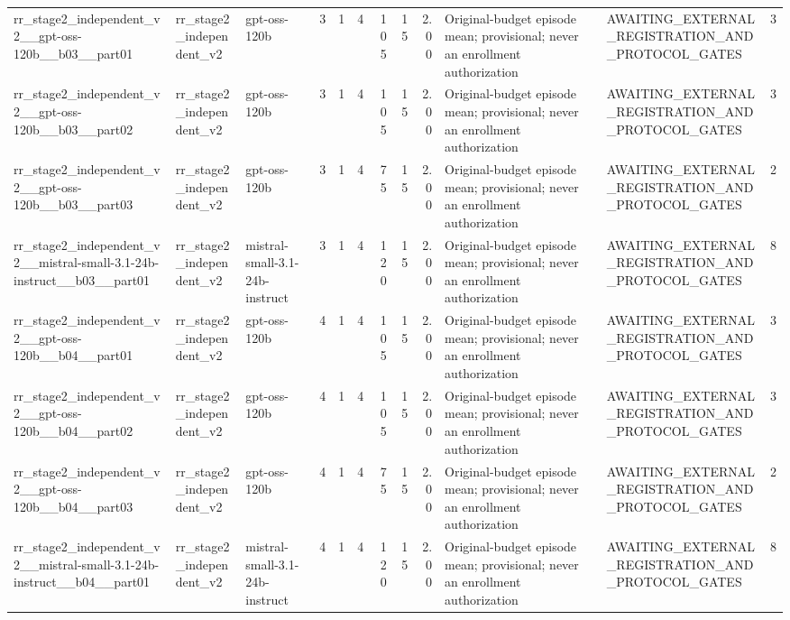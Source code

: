 \begin{tabular}{lllrrrrrrllr}
rr\_stage2\_independent\_v2\_\_gpt-oss-120b\_\_b03\_\_part01 & rr\_stage2\_independent\_v2 & gpt-oss-120b & 3 & 1 & 4 & 105 & 15 & 2.00 & Original-budget episode mean; provisional; never an enrollment authorization & AWAITING\_EXTERNAL\_REGISTRATION\_AND\_PROTOCOL\_GATES & 3 \\
rr\_stage2\_independent\_v2\_\_gpt-oss-120b\_\_b03\_\_part02 & rr\_stage2\_independent\_v2 & gpt-oss-120b & 3 & 1 & 4 & 105 & 15 & 2.00 & Original-budget episode mean; provisional; never an enrollment authorization & AWAITING\_EXTERNAL\_REGISTRATION\_AND\_PROTOCOL\_GATES & 3 \\
rr\_stage2\_independent\_v2\_\_gpt-oss-120b\_\_b03\_\_part03 & rr\_stage2\_independent\_v2 & gpt-oss-120b & 3 & 1 & 4 & 75 & 15 & 2.00 & Original-budget episode mean; provisional; never an enrollment authorization & AWAITING\_EXTERNAL\_REGISTRATION\_AND\_PROTOCOL\_GATES & 2 \\
rr\_stage2\_independent\_v2\_\_mistral-small-3.1-24b-instruct\_\_b03\_\_part01 & rr\_stage2\_independent\_v2 & mistral-small-3.1-24b-instruct & 3 & 1 & 4 & 120 & 15 & 2.00 & Original-budget episode mean; provisional; never an enrollment authorization & AWAITING\_EXTERNAL\_REGISTRATION\_AND\_PROTOCOL\_GATES & 8 \\
rr\_stage2\_independent\_v2\_\_gpt-oss-120b\_\_b04\_\_part01 & rr\_stage2\_independent\_v2 & gpt-oss-120b & 4 & 1 & 4 & 105 & 15 & 2.00 & Original-budget episode mean; provisional; never an enrollment authorization & AWAITING\_EXTERNAL\_REGISTRATION\_AND\_PROTOCOL\_GATES & 3 \\
rr\_stage2\_independent\_v2\_\_gpt-oss-120b\_\_b04\_\_part02 & rr\_stage2\_independent\_v2 & gpt-oss-120b & 4 & 1 & 4 & 105 & 15 & 2.00 & Original-budget episode mean; provisional; never an enrollment authorization & AWAITING\_EXTERNAL\_REGISTRATION\_AND\_PROTOCOL\_GATES & 3 \\
rr\_stage2\_independent\_v2\_\_gpt-oss-120b\_\_b04\_\_part03 & rr\_stage2\_independent\_v2 & gpt-oss-120b & 4 & 1 & 4 & 75 & 15 & 2.00 & Original-budget episode mean; provisional; never an enrollment authorization & AWAITING\_EXTERNAL\_REGISTRATION\_AND\_PROTOCOL\_GATES & 2 \\
rr\_stage2\_independent\_v2\_\_mistral-small-3.1-24b-instruct\_\_b04\_\_part01 & rr\_stage2\_independent\_v2 & mistral-small-3.1-24b-instruct & 4 & 1 & 4 & 120 & 15 & 2.00 & Original-budget episode mean; provisional; never an enrollment authorization & AWAITING\_EXTERNAL\_REGISTRATION\_AND\_PROTOCOL\_GATES & 8 \\

\end{tabular}
